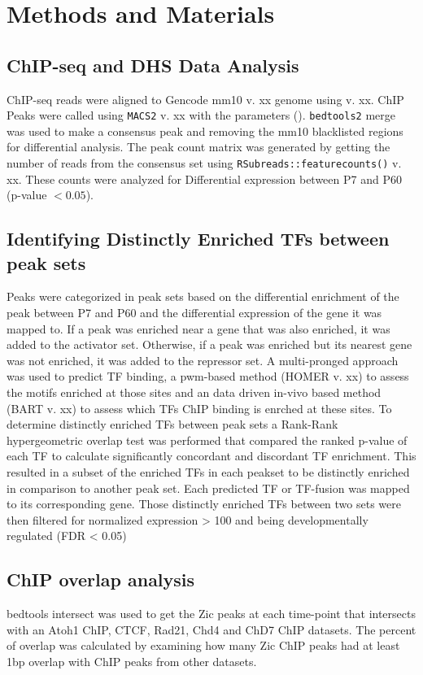 \documentclass[fleqn,10pt,twocolumn]{wlscirep}
\begin{document}
\section*{Methods and Materials}
\subsection*{ChIP-seq and DHS Data Analysis}
ChIP-seq reads were aligned to Gencode mm10 v. xx genome using  v. xx. ChIP Peaks were called using \texttt{MACS2} v. xx with the parameters ().  \texttt{bedtools2} merge was used to make a consensus peak and removing the mm10 blacklisted regions \cite{} for differential analysis. The peak count matrix was generated by getting the number of reads from the consensus set using \texttt{RSubreads::featurecounts()} v. xx. These counts were analyzed for Differential expression between P7 and P60  (p-value $< 0.05$). 


\subsection*{Identifying Distinctly Enriched  TFs between peak sets}
Peaks were categorized in peak sets based on the differential enrichment of the peak between P7 and P60 and the differential expression of the gene it was mapped to. If a peak was enriched near a gene that was also enriched, it was added to the activator set. Otherwise, if a peak was enriched but its nearest gene was not enriched, it was added to the repressor set. A multi-pronged approach was used to predict TF binding, a pwm-based method (HOMER v. xx) \cite{} to assess the motifs enriched at those sites and an data driven in-vivo based method (BART v. xx) \cite{Zhenjiawang2018BART:Profiles, Ma2021BARTweb:Analysis} to assess which TFs ChIP binding is enrched at these sites. To determine distinctly enriched TFs between peak sets a Rank-Rank hypergeometric overlap test \cite{RRHO} was performed that compared the ranked p-value of each TF  to calculate significantly concordant and discordant TF enrichment. This resulted in a subset of the enriched TFs in each peakset to be distinctly enriched in comparison to another peak set.  Each predicted TF or TF-fusion was mapped to its corresponding gene. Those distinctly enriched TFs between two sets were then filtered for normalized expression > 100 and being developmentally regulated (FDR < 0.05)

\subsection*{ChIP overlap analysis}
bedtools intersect was used to get the Zic peaks at each time-point that intersects with an Atoh1 ChIP, CTCF, Rad21, Chd4 and ChD7 ChIP datasets. The percent of overlap was calculated by examining how many Zic ChIP peaks had at least 1bp overlap with ChIP peaks from other datasets. 
\end{document}
